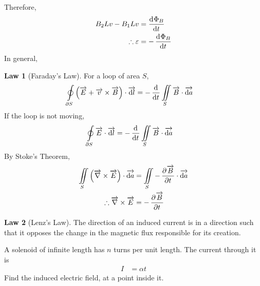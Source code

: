 \documentclass[fleqn, a4paper, 12pt, twoside]{article}
\theoremstyle{definition}
\theoremstyle{theorem}
\newtheorem{law}{Law}
\begin{document}
Therefore,
\begin{align*}
	B_2 L v - B_1 L v      & = \dod{\Phi_B}{t} \\
	\therefore \varepsilon & = -\dod{\Phi_B}{t}
\end{align*}
In general,
\begin{law}[Faraday's Law]
	For a loop of area $S$,
	\begin{align*}
		\oint\limits_{\partial S} \left( \overrightarrow{E} + \overrightarrow{v} \times \overrightarrow{B} \right) \cdot \overrightarrow{\dif l} & = -\dod{}{t} \iint\limits_{S} \overrightarrow{B} \cdot \overrightarrow{\dif a}
	\end{align*}
	If the loop is not moving,
	\begin{align*}
		\oint\limits_{\partial S} \overrightarrow{E} \cdot \overrightarrow{\dif l} & = -\dod{}{t} \iint\limits_{S} \overrightarrow{B} \cdot \overrightarrow{\dif a}
	\end{align*}
	By Stoke's Theorem,
	\begin{align*}
		\iint\limits_{S} \left( \overrightarrow{\nabla} \times \overrightarrow{E} \right) \cdot \overrightarrow{\dif a} & = \iint\limits_{S} -\dpd{\overrightarrow{B}}{t} \cdot \overrightarrow{\dif a} \\
		\therefore \overrightarrow{\nabla} \times \overrightarrow{E}                                                    & = -\dpd{\overrightarrow{B}}{t}
	\end{align*}
	\label{Faraday's_Law}
\end{law}

\begin{law}[Lenz's Law]
	The direction of an induced current is in a direction such that it opposes the change in the magnetic flux responsible for its creation.
	\label{Lenz's_Law}
\end{law}

\begin{question}
	A solenoid of infinite length has $n$ turns per unit length.
	The current through it is
	\begin{align*}
		I &= \alpha t
	\end{align*}
	Find the induced electric field, at a point inside it.
\end{question}
\end{document}
